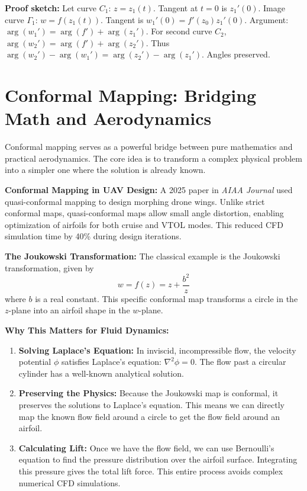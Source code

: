 \documentclass[12pt,a4paper]{article}
\begin{document}
\textbf{Proof sketch:} Let curve $C_1$: $z = z_1(t)$. Tangent at $t=0$ is $z_1'(0)$. Image curve $\Gamma_1$: $w = f(z_1(t))$. Tangent is $w_1'(0) = f'(z_0)z_1'(0)$. Argument: $\arg(w_1') = \arg(f') + \arg(z_1')$. For second curve $C_2$, $\arg(w_2') = \arg(f') + \arg(z_2')$. Thus $\arg(w_2') - \arg(w_1') = \arg(z_2') - \arg(z_1')$. Angles preserved.
\section{Conformal Mapping: Bridging Math and Aerodynamics}

Conformal mapping serves as a powerful bridge between pure mathematics and practical aerodynamics. The core idea is to transform a complex physical problem into a simpler one where the solution is already known.
\begin{tcolorbox}[colback=blue!5!white,colframe=blue!75!black,title=2025 Research Highlight]
\textbf{Conformal Mapping in UAV Design:} A 2025 paper in \textit{AIAA Journal} used quasi-conformal mapping to design morphing drone wings. Unlike strict conformal maps, quasi-conformal maps allow small angle distortion, enabling optimization of airfoils for both cruise and VTOL modes. This reduced CFD simulation time by 40\% during design iterations.
\end{tcolorbox}
\textbf{The Joukowski Transformation:} The classical example is the Joukowski transformation, given by
$$w = f(z) = z + \frac{b^2}{z}$$
where $b$ is a real constant. This specific conformal map transforms a circle in the $z$-plane into an airfoil shape in the $w$-plane.

\textbf{Why This Matters for Fluid Dynamics:}
\begin{enumerate}
    \item \textbf{Solving Laplace's Equation:} In inviscid, incompressible flow, the velocity potential $\phi$ satisfies Laplace's equation: $\nabla^2 \phi = 0$. The flow past a circular cylinder has a well-known analytical solution.
    \item \textbf{Preserving the Physics:} Because the Joukowski map is conformal, it preserves the solutions to Laplace's equation. This means we can directly map the known flow field around a circle to get the flow field around an airfoil.
    \item \textbf{Calculating Lift:} Once we have the flow field, we can use Bernoulli's equation to find the pressure distribution over the airfoil surface. Integrating this pressure gives the total lift force. This entire process avoids complex numerical CFD simulations.
\end{enumerate}
\end{document}
